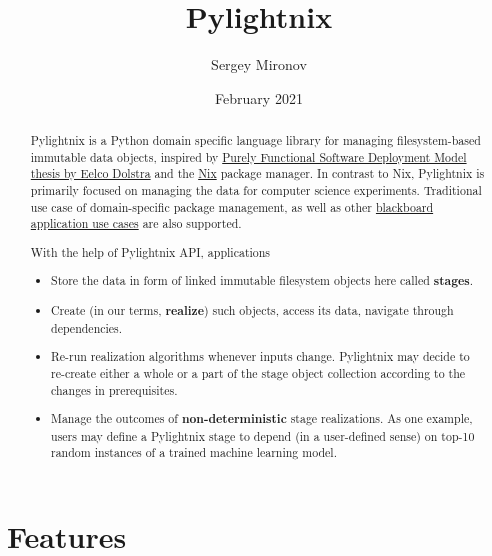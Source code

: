 \documentclass{article}
\begin{document}

\title{Pylightnix}
\author{Sergey Mironov}
\date{February 2021}
\maketitle


\begin{abstract}

Pylightnix is a Python domain specific language library for managing
filesystem-based immutable data objects, inspired by
\href{https://edolstra.github.io/pubs/phd-thesis.pdf}{Purely Functional
Software Deployment Model thesis by Eelco Dolstra} and the
\href{https://nixos.org}{Nix} package manager. In contrast to Nix, Pylightnix
is primarily focused on managing the data for computer science experiments.
Traditional use case of domain-specific package management, as well as other
\href{https://en.wikipedia.org/wiki/Blackboard_design_pattern}{blackboard
application use cases} are also supported.

With the help of Pylightnix API, applications
\begin{itemize}
  \item Store the data in form of linked immutable filesystem objects here
    called \textbf{stages}.
  \item Create (in our terms, \textbf{realize}) such objects, access its
    data, navigate through dependencies.
  \item Re-run realization algorithms whenever inputs change. Pylightnix
    may decide to re-create either a whole or a part of the stage object
    collection according to the changes in prerequisites.
  \item Manage the outcomes of \textbf{non-deterministic} stage realizations.
    As one example, users may define a Pylightnix stage to depend (in a
    user-defined sense) on top-10 random instances of a trained machine learning
    model.
\end{itemize}

\end{abstract}

\section{Features}
\end{document}
